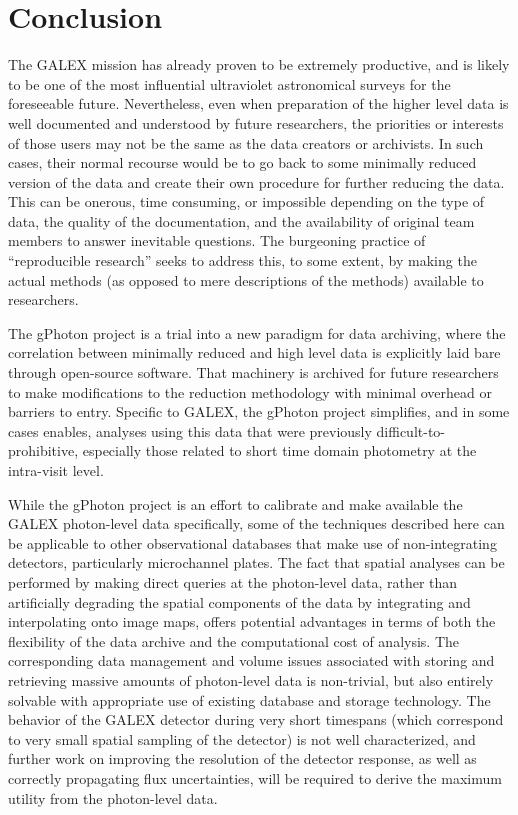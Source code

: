 \documentclass[5p]{elsarticle}
\begin{document}
\section{Conclusion}

The GALEX mission has already proven to be extremely productive, and is likely to be one of the most influential ultraviolet astronomical surveys for the foreseeable future.  Nevertheless, even when preparation of the higher level data is well documented and understood by future researchers, the priorities or interests of those users may not be the same as the data creators or archivists. In such cases, their normal recourse would be to go back to some minimally reduced version of the data and create their own procedure for further reducing the data. This can be onerous, time consuming, or impossible depending on the type of data, the quality of the documentation, and the availability of original team members to answer inevitable questions. The burgeoning practice of ``reproducible research'' seeks to address this, to some extent, by making the actual methods (as opposed to mere descriptions of the methods) available to researchers.

The gPhoton project is a trial into a new paradigm for data archiving, where the correlation between minimally reduced and high level data is explicitly laid bare through open-source software.  That machinery is archived for future researchers to make modifications to the reduction methodology with minimal overhead or barriers to entry.  Specific to GALEX, the gPhoton project simplifies, and in some cases enables, analyses using this data that were previously difficult-to-prohibitive, especially those related to short time domain photometry at the intra-visit level.

While the gPhoton project is an effort to calibrate and make available the GALEX photon-level data specifically, some of the techniques described here can be applicable to other observational databases that make use of non-integrating detectors, particularly microchannel plates. The fact that spatial analyses can be performed by making direct queries at the photon-level data, rather than artificially degrading the spatial components of the data by integrating and interpolating onto image maps, offers potential advantages in terms of both the flexibility of the data archive and the computational cost of analysis. The corresponding data management and volume issues associated with storing and retrieving massive amounts of photon-level data is non-trivial, but also entirely solvable with appropriate use of existing database and storage technology. The behavior of the GALEX detector during very short timespans (which correspond to very small spatial sampling of the detector) is not well characterized, and further work on improving the resolution of the detector response, as well as correctly propagating flux uncertainties, will be required to derive the maximum utility from the photon-level data.
\end{document}
